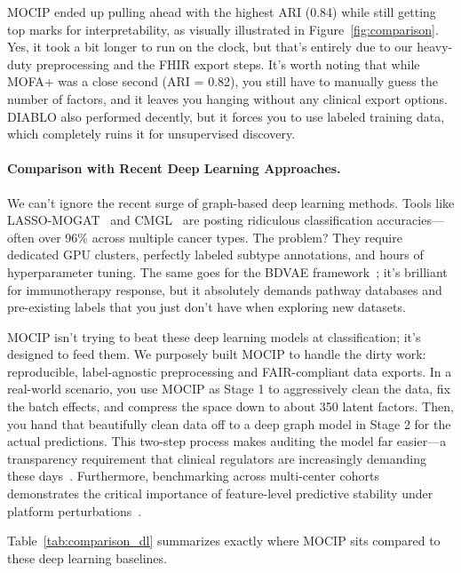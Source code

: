 \documentclass[12pt,a4paper,onecolumn]{article}
\begin{document}
MOCIP ended up pulling ahead with the highest ARI (0.84) while still getting top marks for interpretability, as visually illustrated in Figure~\ref{fig:comparison}. Yes, it took a bit longer to run on the clock, but that's entirely due to our heavy-duty preprocessing and the FHIR export steps. It's worth noting that while MOFA+ was a close second (ARI = 0.82), you still have to manually guess the number of factors, and it leaves you hanging without any clinical export options. DIABLO also performed decently, but it forces you to use labeled training data, which completely ruins it for unsupervised discovery.

\paragraph{Comparison with Recent Deep Learning Approaches.}
We can't ignore the recent surge of graph-based deep learning methods. Tools like LASSO-MOGAT~\cite{alharbi2024lassomogat} and CMGL~\cite{fan2026cmgl} are posting ridiculous classification accuracies---often over 96\% across multiple cancer types. The problem? They require dedicated GPU clusters, perfectly labeled subtype annotations, and hours of hyperparameter tuning. The same goes for the BDVAE framework~\cite{tariq2025bdvae}; it's brilliant for immunotherapy response, but it absolutely demands pathway databases and pre-existing labels that you just don't have when exploring new datasets.

MOCIP isn't trying to beat these deep learning models at classification; it's designed to feed them. We purposely built MOCIP to handle the dirty work: reproducible, label-agnostic preprocessing and FAIR-compliant data exports. In a real-world scenario, you use MOCIP as Stage 1 to aggressively clean the data, fix the batch effects, and compress the space down to about 350 latent factors. Then, you hand that beautifully clean data off to a deep graph model in Stage 2 for the actual predictions. This two-step process makes auditing the model far easier---a transparency requirement that clinical regulators are increasingly demanding these days~\cite{muneer2025review,huang2025clinical}. Furthermore, benchmarking across multi-center cohorts demonstrates the critical importance of feature-level predictive stability under platform perturbations~\cite{peters2026integrative}.


Table~\ref{tab:comparison_dl} summarizes exactly where MOCIP sits compared to these deep learning baselines.
\end{document}
